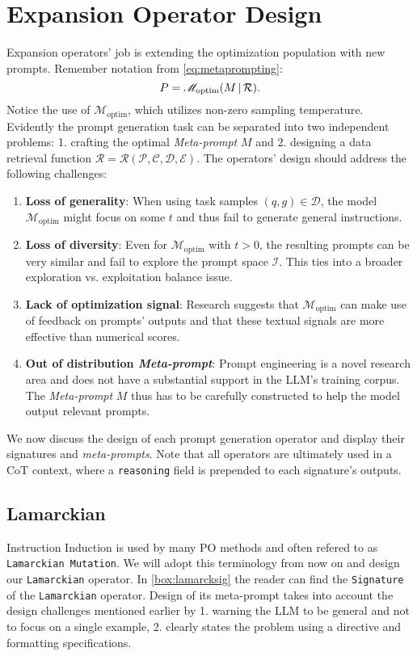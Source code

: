 \section{Expansion Operator Design}
Expansion operators' job is extending the optimization population with new prompts. Remember notation from \ref{eq:metaprompting}:
\begin{equation*}
    P = \mathscr{M}_{\text{optim}}(M\, \vert \, \mathcal{R}).
\end{equation*}
Notice the use of $\mathscr{M}_{\text{optim}}$, which utilizes non-zero sampling temperature. Evidently the prompt generation task can be separated into two independent problems: 1. crafting the optimal \textit{Meta-prompt} $M$ 
and 2. designing a data retrieval function $\mathcal{R} = \mathcal{R}(\mathcal{P}, \mathcal{C}, \mathcal{D}, \mathcal{E})$.
The operators' design should address the following challenges:
\begin{enumerate}
    \item \textbf{Loss of generality}: When using task samples $(q, g) \in \mathcal{D}$, the model $\mathcal{M}_{\text{optim}}$ might focus on some $t$ and thus fail to generate general instructions.
    \item \textbf{Loss of diversity}: Even for  $\mathscr{M}_{\text{optim}}$ with $t>0$, the resulting prompts can be very similar and fail to explore the prompt space $\mathcal{I}$. 
    This ties into a broader exploration vs. exploitation balance issue.
    \item \textbf{Lack of optimization signal}: Research\cite{he2024crispomultiaspectcritiquesuggestionguidedautomatic}\cite{xiang2025selfsupervisedpromptoptimization} suggests that $\mathcal{M}_{\text{optim}}$ 
    can make use of feedback on prompts' outputs and that these textual signals are more effective than numerical scores.
    \item \textbf{Out of distribution \textit{Meta-prompt}}: Prompt engineering is a novel research area and does not have a substantial support in the LLM's training corpus.
    The \textit{Meta-prompt} $M$ thus has to be carefully constructed to help the model output relevant prompts.
\end{enumerate}

We now discuss the design of each prompt generation operator and display their signatures and \textit{meta-prompts}. 
Note that all operators are ultimately used in a CoT context, where a \texttt{reasoning} field is prepended to each signature's outputs.
\subsection{Lamarckian}
Instruction Induction\cite{honovich2022instructioninductionexamplesnatural} is used by many PO methods and often refered to as \texttt{Lamarckian Mutation}. 
We will adopt this terminology from now on and design our \texttt{Lamarckian} operator. 
In \ref{box:lamarcksig} the reader can find the \texttt{Signature} of the \texttt{Lamarckian} operator.
Design of its meta-prompt takes into account the design challenges mentioned earlier by 1. warning the LLM to be general and not to focus on a single example, 
2. clearly states the problem using a directive and formatting specifications. 


